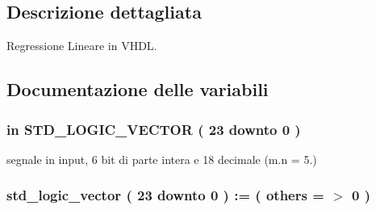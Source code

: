 \subsection{Descrizione dettagliata}
Regressione Lineare in V\+H\+DL. 



\subsection{Documentazione delle variabili}
\subsubsection[{\texorpdfstring{A}{A}}]{ {\bfseries \textcolor{vhdlchar}{in}\textcolor{vhdlchar}{ }} {\bfseries \textcolor{vhdlchar}{S\+T\+D\+\_\+\+L\+O\+G\+I\+C\+\_\+\+V\+E\+C\+T\+OR}\textcolor{vhdlchar}{ }\textcolor{vhdlchar}{(}\textcolor{vhdlchar}{ }\textcolor{vhdlchar}{ } \textcolor{vhdldigit}{23} \textcolor{vhdlchar}{ }\textcolor{vhdlchar}{downto}\textcolor{vhdlchar}{ }\textcolor{vhdlchar}{ } \textcolor{vhdldigit}{0} \textcolor{vhdlchar}{ }\textcolor{vhdlchar}{)}\textcolor{vhdlchar}{ }} \hspace{0.3cm}{\ttfamily [Port]}}\hypertarget{group___linear_regression_gae1ad6503d157f6c26abdce1131d31ec2}{}\label{group___linear_regression_gae1ad6503d157f6c26abdce1131d31ec2}


segnale in input, 6 bit di parte intera e 18 decimale (m.\+n = 5.) 

\subsubsection[{\texorpdfstring{a\+\_\+buff0}{a_buff0}}]{ {\bfseries \textcolor{vhdlchar}{std\+\_\+logic\+\_\+vector}\textcolor{vhdlchar}{ }\textcolor{vhdlchar}{(}\textcolor{vhdlchar}{ }\textcolor{vhdlchar}{ } \textcolor{vhdldigit}{23} \textcolor{vhdlchar}{ }\textcolor{vhdlchar}{downto}\textcolor{vhdlchar}{ }\textcolor{vhdlchar}{ } \textcolor{vhdldigit}{0} \textcolor{vhdlchar}{ }\textcolor{vhdlchar}{)}\textcolor{vhdlchar}{ }\textcolor{vhdlchar}{ }\textcolor{vhdlchar}{ }\textcolor{vhdlchar}{\+:}\textcolor{vhdlchar}{=}\textcolor{vhdlchar}{ }\textcolor{vhdlchar}{(}\textcolor{vhdlchar}{ }\textcolor{vhdlchar}{ }\textcolor{vhdlchar}{others}\textcolor{vhdlchar}{ }\textcolor{vhdlchar}{ }\textcolor{vhdlchar}{=}\textcolor{vhdlchar}{ }\textcolor{vhdlchar}{$>$}\textcolor{vhdlchar}{ }\textcolor{vhdlchar}{\textquotesingle{}}\textcolor{vhdlchar}{ } \textcolor{vhdldigit}{0} \textcolor{vhdlchar}{ }\textcolor{vhdlchar}{\textquotesingle{}}\textcolor{vhdlchar}{ }\textcolor{vhdlchar}{)}\textcolor{vhdlchar}{ }} \hspace{0.3cm}{\ttfamily [Signal]}}\hypertarget{group___linear_regression_gacd3d8e92fe616148f1e148b474c065d5}{}\label{group___linear_regression_gacd3d8e92fe616148f1e148b474c065d5}



